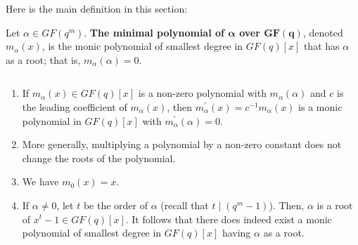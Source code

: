 Here is the main definition in this section:
\begin{defbox}
    \begin{definition}
        Let $ \alpha\in GF(q^m) $. \textbf{The minimal polynomial
        of $ \bm{\alpha} $ over $ \bm{GF(q)} $}, denoted $ m_\alpha(x) $, is
        the monic polynomial of smallest degree in $ GF(q)[x] $ that
        has $ \alpha $ as a root; that is, $ m_\alpha(\alpha)=0 $.
    \end{definition}
\end{defbox}
\begin{remark} $ \; $
    \begin{enumerate}[(1)]
        \item If $ m_\alpha(x)\in GF(q)[x] $ is a non-zero polynomial with $ m_\alpha(\alpha) $
        and $ c $ is the leading coefficient of $ m_\alpha(x) $, then
        $ m_\alpha^\prime(x)=c^{-1}m_\alpha(x) $ is a monic polynomial in $ GF(q)[x] $
        with $ m_\alpha^\prime(\alpha)=0 $.
        \item More generally, multiplying a polynomial by a non-zero constant does not change
        the roots of the polynomial.
        \item We have $ m_0(x)=x $.
        \item If $ \alpha\neq 0 $, let $ t $ be the order of $ \alpha $
        (recall that $ t\mid (q^m-1) $). Then, $ \alpha $ is a root of $ x^t-1\in GF(q)[x] $.
        It follows that there does indeed exist a monic polynomial of smallest degree in $ GF(q)[x] $
        having $ \alpha $ as a root.
    \end{enumerate}
\end{remark}

